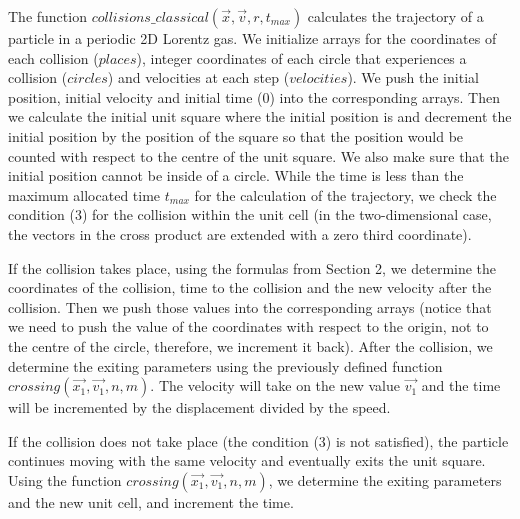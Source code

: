 \documentclass{iopart}
\begin{document}
The function $collisions\_classical(\vec{x}, \vec{v}, r, t_{max})$ calculates the trajectory of a particle in a periodic 2D Lorentz gas. We initialize arrays for the coordinates of each collision ($places$), integer coordinates of each circle that experiences a collision ($circles$) and velocities at each step ($velocities$). We push the initial position, initial velocity and initial time (0) into the corresponding arrays. Then we calculate the initial unit square where the initial position is and decrement the initial position by the position of the square so that the position would be counted with respect to the centre of the unit square. We also make sure that the initial position cannot be inside of a circle. While the time is less than the maximum allocated time $t_{max}$ for the calculation of the trajectory, we check the condition (3) for the collision within the unit cell (in the two-dimensional case, the vectors in the cross product are extended with a zero third coordinate).

If the collision takes place, using the formulas from Section 2, we determine the coordinates of the collision, time to the collision and the new velocity after the collision. Then we push those values into the corresponding arrays (notice that we need to push the value of the coordinates with respect to the origin, not to the centre of the circle, therefore, we increment it back). After the collision, we determine the exiting parameters using the previously defined function $crossing(\vec{x_1}, \vec{v_1}, n, m)$. The velocity will take on the new value $\vec{v_1}$ and the time will be incremented by the displacement divided by the speed.

If the collision does not take place (the condition (3) is not satisfied), the particle continues moving with the same velocity and eventually exits the unit square. Using the function $crossing(\vec{x_1}, \vec{v_1}, n, m)$, we determine the exiting parameters and the new unit cell, and increment the time.
\end{document}
